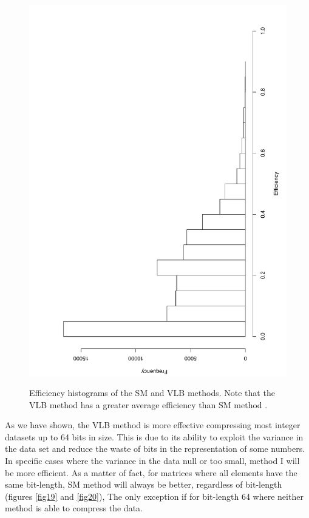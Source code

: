 \documentclass[10pt]{article}
\begin{document}
\begin{figure}[h]
{  \includegraphics[scale=0.25,angle=-90]{fig18}
  \label{fig:18}
  }
  \caption{Efficiency histograms of the SM and VLB methods. Note that the VLB method has a greater average efficiency than SM method .}
  \label{fig:1718}
\end{figure}

As we have shown, the VLB method is more effective compressing most integer datasets up to 64 bits in size. This is due to its ability to exploit the variance in the data set and reduce the waste of bits in the representation of some numbers. In specific cases where the variance in the data null or too small, method I will be more efficient. As a matter of fact, for matrices where all elements have the same bit-length, SM method  will always be better, regardless of bit-length (figures \ref{fig19} and \ref{fig20}), The only exception if for bit-length 64 where neither method is able to compress the data. 
\end{document}
